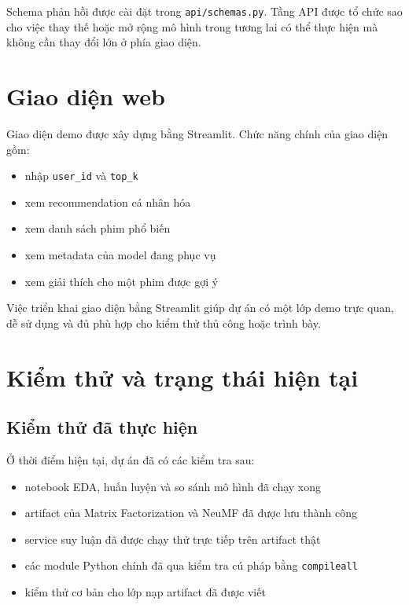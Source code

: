 \documentclass[12pt,a4paper]{article}
\begin{document}
Schema phản hồi được cài đặt trong \texttt{api/schemas.py}. Tầng API được tổ chức sao cho việc thay thế hoặc mở rộng mô hình trong tương lai có thể thực hiện mà không cần thay đổi lớn ở phía giao diện.

\section{Giao diện web}

Giao diện demo được xây dựng bằng Streamlit. Chức năng chính của giao diện gồm:

\begin{itemize}[leftmargin=1.5cm]
    \item nhập \texttt{user\_id} và \texttt{top\_k}
    \item xem recommendation cá nhân hóa
    \item xem danh sách phim phổ biến
    \item xem metadata của model đang phục vụ
    \item xem giải thích cho một phim được gợi ý
\end{itemize}

Việc triển khai giao diện bằng Streamlit giúp dự án có một lớp demo trực quan, dễ sử dụng và đủ phù hợp cho kiểm thử thủ công hoặc trình bày.

\section{Kiểm thử và trạng thái hiện tại}

\subsection{Kiểm thử đã thực hiện}

Ở thời điểm hiện tại, dự án đã có các kiểm tra sau:

\begin{itemize}[leftmargin=1.5cm]
    \item notebook EDA, huấn luyện và so sánh mô hình đã chạy xong
    \item artifact của Matrix Factorization và NeuMF đã được lưu thành công
    \item service suy luận đã được chạy thử trực tiếp trên artifact thật
    \item các module Python chính đã qua kiểm tra cú pháp bằng \texttt{compileall}
    \item kiểm thử cơ bản cho lớp nạp artifact đã được viết
\end{itemize}
\end{document}
